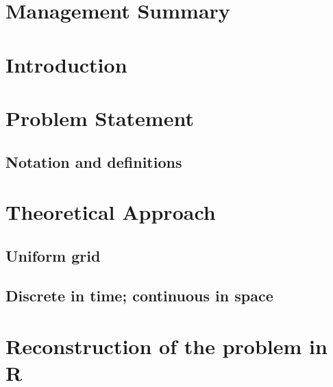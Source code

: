 \documentclass[a4paper, twoside, 11pt]{report}
\theoremstyle{plain}
\theoremstyle{definition}
\theoremstyle{remark}
\begin{document}
\begin{abstract}
	\thispagestyle{plain}
	\lipsum[1]
\end{abstract}


\tableofcontents

\clearpage

\cleardoublepage


\restoregeometry






\chapter*{Management Summary}


\chapter*{Introduction}


\chapter{Problem Statement}

\section{Notation and definitions}

\chapter{Theoretical Approach}

\section{Uniform grid}

\section{Discrete in time; continuous in space}

\pagestyle{fancy}

\chapter{Reconstruction of the problem in R}
\end{document}
